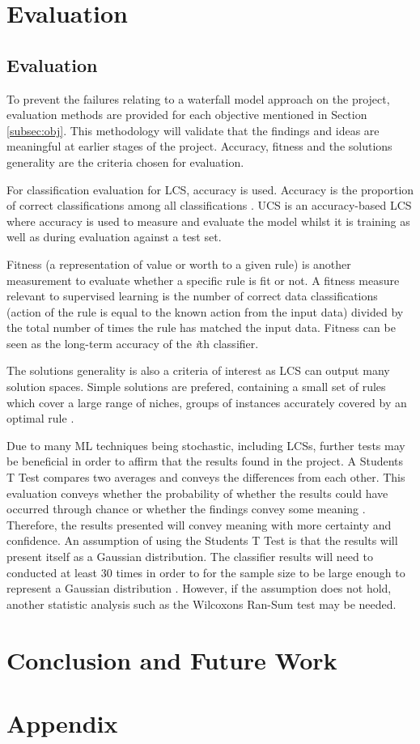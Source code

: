 \chapter{Evaluation}
\section{Evaluation} \label{sec:eval}
To prevent the failures relating to a waterfall model approach on the project, evaluation methods are provided for each objective mentioned in Section \ref{subsec:obj}. This methodology will validate that the findings and ideas are  meaningful at earlier stages of the project. Accuracy, fitness and the solution\textquotesingle s generality are the criteria chosen for evaluation.

For classification evaluation for LCS, accuracy is used. Accuracy is the proportion of correct classifications among all classifications \cite{urbanowicz2017introduction}. UCS is an accuracy-based LCS where accuracy is used to measure and evaluate the model whilst it is training as well as during evaluation against a test set.

Fitness (a representation of value or worth to a given rule)\cite{urbanowicz2017introduction} is another measurement to evaluate whether a specific rule is fit or not. A fitness measure relevant to supervised learning is the number of correct data classifications (action of the rule is equal to the known action from the input data) divided by the total number of times the rule has matched the input data. Fitness can be seen as the long-term accuracy of the \textit{i}th classifier.

The solution\textquotesingle s generality is also a criteria of interest as LCS can output many solution spaces. Simple solutions are prefered, containing a small set of rules which cover a large range of niches, groups of instances accurately covered by an optimal rule \cite{urbanowicz2017introduction}. 

Due to many ML techniques being stochastic, including LCSs, further tests may be beneficial in order to affirm that the results found in the project. A Student\textquotesingle s T Test compares two averages and conveys the differences from each other. This evaluation conveys whether the probability of whether the results could have occurred through chance or whether the findings convey some meaning \cite{blair1980comparison}. Therefore, the results presented will convey meaning with more certainty and confidence. An assumption of using the Student\textquotesingle s T Test is that the results will present itself as a Gaussian distribution. The classifier results will need to conducted at least 30 times in order to for the sample size to be large enough to represent a Gaussian distribution \cite{blair1980comparison}. However, if the assumption does not hold, another statistic analysis such as the Wilcoxon\textquotesingle s Ran-Sum test \cite{wilcoxon1950some} may be needed.


\chapter{Conclusion and Future Work}

\chapter{Appendix}
